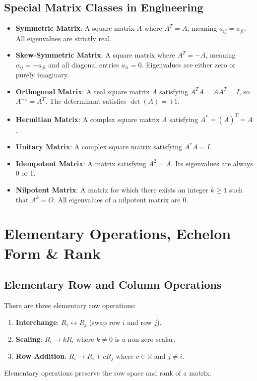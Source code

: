 \subsection{Special Matrix Classes in Engineering}
\begin{itemize}[leftmargin=1.5em]
    \item \textbf{Symmetric Matrix}: A square matrix $A$ where $A^T = A$, meaning $a_{ij} = a_{ji}$. All eigenvalues are strictly real.
    \item \textbf{Skew-Symmetric Matrix}: A square matrix where $A^T = -A$, meaning $a_{ij} = -a_{ji}$ and all diagonal entries $a_{ii} = 0$. Eigenvalues are either zero or purely imaginary.
    \item \textbf{Orthogonal Matrix}: A real square matrix $A$ satisfying $A^T A = A A^T = I$, so $A^{-1} = A^T$. The determinant satisfies $\det(A) = \pm 1$.
    \item \textbf{Hermitian Matrix}: A complex square matrix $A$ satisfying $A^* = (\bar{A})^T = A$.
    \item \textbf{Unitary Matrix}: A complex square matrix satisfying $A^* A = I$.
    \item \textbf{Idempotent Matrix}: A matrix satisfying $A^2 = A$. Its eigenvalues are always 0 or 1.
    \item \textbf{Nilpotent Matrix}: A matrix for which there exists an integer $k \ge 1$ such that $A^k = O$. All eigenvalues of a nilpotent matrix are 0.
\end{itemize}

\section{Elementary Operations, Echelon Form \& Rank}

\subsection{Elementary Row and Column Operations}
There are three elementary row operations:
\begin{enumerate}[leftmargin=1.5em]
    \item \textbf{Interchange}: $R_i \leftrightarrow R_j$ (swap row $i$ and row $j$).
    \item \textbf{Scaling}: $R_i \to k R_i$ where $k \ne 0$ is a non-zero scalar.
    \item \textbf{Row Addition}: $R_i \to R_i + c R_j$ where $c \in \mathbb{R}$ and $j \ne i$.
\end{enumerate}
Elementary operations preserve the row space and rank of a matrix.

